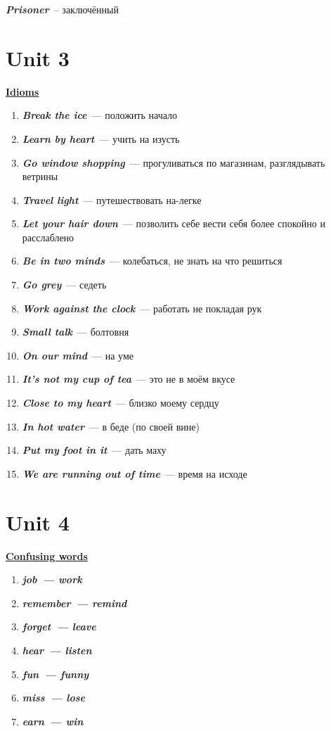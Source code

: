 \documentclass[10pt,a4paper]{article}
\begin{document}
\textit{\textbf{Prisoner}}~-- заключённый





\section{Unit 3}
\textbf{\underline{Idioms}}

\begin{enumerate}
  \item \textit{\textbf{Break the ice}}~--- положить начало 
  \item \textit{\textbf{Learn by heart}}~--- учить на изусть
  \item \textit{\textbf{Go window shopping}}~--- прогуливаться по магазинам, разглядывать ветрины
  \item \textit{\textbf{Travel light}}~--- путешествовать на-легке
  \item \textit{\textbf{Let your hair down}}~--- позволить себе вести себя более спокойно и расслаблено
  \item \textit{\textbf{Be in two minds}}~--- колебаться, не знать на что решиться
  \item \textit{\textbf{Go grey}}~--- седеть
  \item \textit{\textbf{Work against the clock}}~--- работать не покладая рук
  \item \textit{\textbf{Small talk}}~--- болтовня
  \item \textit{\textbf{On our mind}}~--- на уме
  \item \textit{\textbf{It's not my cup of tea}}~--- это не в моём вкусе
  \item \textit{\textbf{Close to my heart}}~--- близко моему сердцу
  \item \textit{\textbf{In hot water}}~--- в беде (по своей вине)
  \item \textit{\textbf{Put my foot in it}}~--- дать маху
  \item \textit{\textbf{We are running out of time}}~--- время на исходе
\end{enumerate}

 
 


\section{Unit 4}

\textbf{\underline{Confusing words}}
\begin{enumerate}
  \item \textit{\textbf{job~--- work}}
  \item \textit{\textbf{remember~--- remind}}
  \item \textit{\textbf{forget~--- leave}}
  \item \textit{\textbf{hear~--- listen}}
  \item \textit{\textbf{fun~--- funny}}
  \item \textit{\textbf{miss~--- lose}}
  \item \textit{\textbf{earn~--- win}}
\end{enumerate}
\end{document}
